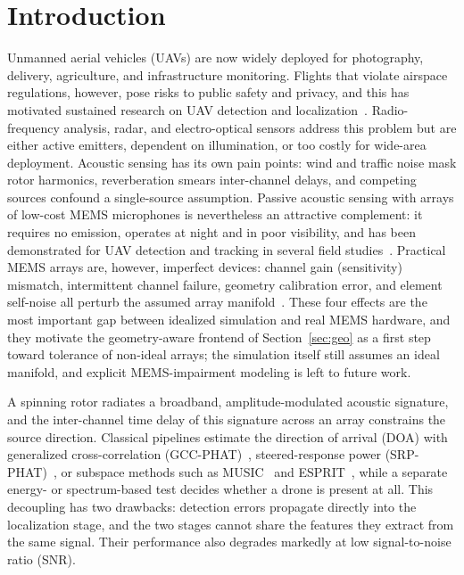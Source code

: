 \documentclass[sensors,article,submit,pdftex,moreauthors]{Definitions/mdpi}
\begin{document}
\section{Introduction}
\label{sec:intro}
Unmanned aerial vehicles (UAVs) are now widely deployed for photography, delivery, agriculture, and infrastructure monitoring. Flights that violate airspace regulations, however, pose risks to public safety and privacy, and this has motivated sustained research on UAV detection and localization~\cite{taha2019drone}. Radio-frequency analysis, radar, and electro-optical sensors address this problem but are either active emitters, dependent on illumination, or too costly for wide-area deployment. Acoustic sensing has its own pain points: wind and traffic noise mask rotor harmonics, reverberation smears inter-channel delays, and competing sources confound a single-source assumption. Passive acoustic sensing with arrays of low-cost MEMS microphones is nevertheless an attractive complement: it requires no emission, operates at night and in poor visibility, and has been demonstrated for UAV detection and tracking in several field studies~\cite{case2008uav,busset2015acoustic}. Practical MEMS arrays are, however, imperfect devices: channel gain (sensitivity) mismatch, intermittent channel failure, geometry calibration error, and element self-noise all perturb the assumed array manifold~\cite{yan2023mems}. These four effects are the most important gap between idealized simulation and real MEMS hardware, and they motivate the geometry-aware frontend of Section~\ref{sec:geo} as a first step toward tolerance of non-ideal arrays; the simulation itself still assumes an ideal manifold, and explicit MEMS-impairment modeling is left to future work.

A spinning rotor radiates a broadband, amplitude-modulated acoustic signature, and the inter-channel time delay of this signature across an array constrains the source direction. Classical pipelines estimate the direction of arrival (DOA) with generalized cross-correlation (GCC-PHAT)~\cite{knapp1976gcc}, steered-response power (SRP-PHAT)~\cite{dibiase2001srp}, or subspace methods such as MUSIC~\cite{schmidt1986music} and ESPRIT~\cite{roy1989esprit}, while a separate energy- or spectrum-based test decides whether a drone is present at all. This decoupling has two drawbacks: detection errors propagate directly into the localization stage, and the two stages cannot share the features they extract from the same signal. Their performance also degrades markedly at low signal-to-noise ratio (SNR).
\end{document}
